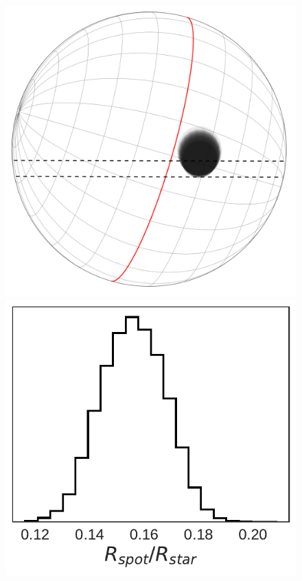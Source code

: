 \begin{figure}
\centering
\includegraphics[scale=0.2]{stsp_hat_p_11/transit071.pdf}
\includegraphics[scale=0.3]{stsp_hat_p_11/rad_071.pdf}

\end{figure}
